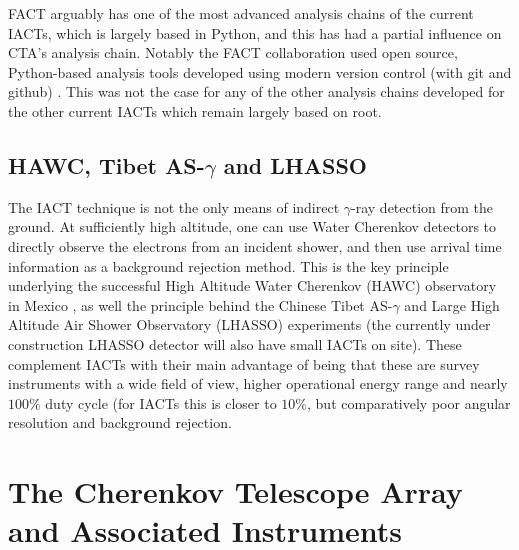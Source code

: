 FACT arguably has one of the most advanced analysis chains of the current IACTs, which is largely based in Python, and this has had a partial influence on CTA's analysis chain. Notably the FACT collaboration used open source, Python-based analysis tools developed using modern version control (with git and github) \cite{factspec}. This was not the case for any of the other analysis chains developed for the other current IACTs which remain largely based on root.

\subsection{HAWC, Tibet AS-\ensuremath{\gamma} and LHASSO}

The IACT technique is not the only means of indirect $\gamma$-ray detection from the ground. At sufficiently high altitude, one can use Water Cherenkov detectors to directly observe the electrons from an incident shower, and then use arrival time information as a background rejection method. This is the key principle underlying the successful High Altitude Water Cherenkov (HAWC) observatory in Mexico \cite{hawc}, as well the principle behind the Chinese Tibet AS-$\gamma$ \cite{asgamma} and Large High Altitude Air Shower Observatory (LHASSO) \cite{lhassocrab} experiments (the currently under construction LHASSO detector will also have small IACTs on site). These complement IACTs with their main advantage of being that these are survey instruments with a wide field of view, higher operational energy range and nearly $100\%$ duty cycle (for IACTs this is closer to $10\%$, but comparatively poor angular resolution and background rejection. 

\section{The Cherenkov Telescope Array and Associated Instruments}
